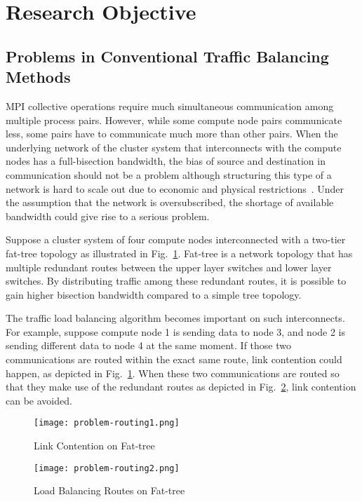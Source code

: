 \section{Research Objective}\label{sec:iii-background}

\subsection{Problems in Conventional Traffic Balancing Methods}

MPI collective operations require much simultaneous communication among
multiple process pairs. However, while some compute node pairs
communicate less, some pairs have to communicate much more than other
pairs. When the underlying network of the cluster system that
interconnects with the compute nodes has a full-bisection bandwidth,
the bias of source and destination in communication should not be a
problem although structuring this type of a network is hard to scale out
due to economic and physical restrictions~\autocite{Al-Fares2008}. Under the
assumption that the network is oversubscribed, the shortage of available
bandwidth could give rise to a serious problem.

Suppose a cluster system of four compute nodes interconnected with a
two-tier fat-tree topology as illustrated in Fig.~\ref{fig:problem-routing1}.
Fat-tree is a network topology that has multiple redundant routes between the
upper layer switches and lower layer switches. By distributing traffic among
these redundant routes, it is possible to gain higher bisection bandwidth
compared to a simple tree topology.

The traffic load balancing algorithm becomes important on such interconnects.
For example, suppose
compute node 1 is sending data to node 3, and node 2 is sending
different data to node 4 at the same moment. If those two communications
are routed within the exact same route, link contention could happen, as
depicted in Fig.~\ref{fig:problem-routing1}. When these two
communications are routed so that they make use of the redundant routes
as depicted in Fig.~\ref{fig:problem-routing2}, link contention can be
avoided.

\begin{figure}
    \centering
    \texttt{[image: problem-routing1.png]}
    \caption{Link Contention on Fat-tree}%
    \label{fig:problem-routing1}
\end{figure}

\begin{figure}
    \centering
    \texttt{[image: problem-routing2.png]}
    \caption{Load Balancing Routes on Fat-tree}%
    \label{fig:problem-routing2}
\end{figure}

